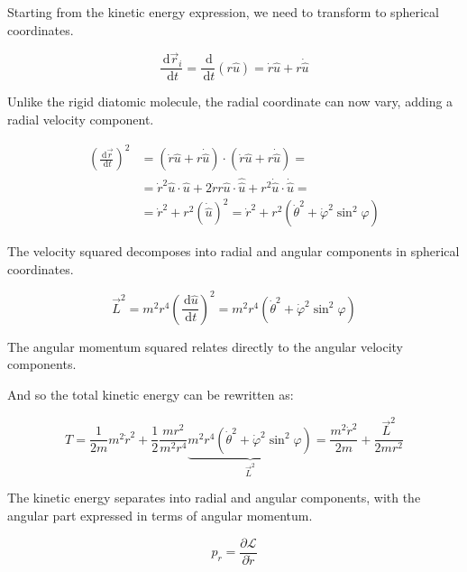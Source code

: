 \documentclass[italian]{HKNdocument}
\begin{document}
Starting from the kinetic energy expression, we need to transform to spherical coordinates.

\begin{equation}
\frac{\, \mathrm{d} \vec{r}_{i}}{\, \mathrm{d} t}=\frac{\, \mathrm{d}}{\, \mathrm{d} t}(r \hat{u})=\dot{r} \hat{u}+r \dot{\hat{u}}
\end{equation}

Unlike the rigid diatomic molecule, the radial coordinate can now vary, adding a radial velocity component.

\begin{align}
\left(\frac{\, \mathrm{d} \vec{r}}{\, \mathrm{d} t}\right)^{2} & =(\dot{r} \hat{u}+r \dot{\hat{u}}) \cdot(\dot{r} \hat{u}+r \dot{\hat{u}})= \\
& =\dot{r}^{2} \hat{u} \cdot \hat{u}+2 \dot{r} r \hat{u} \cdot \hat{\hat{u}}+r^{2} \dot{\hat{u}} \cdot \dot{\hat{u}}=  \\
& =\dot{r}^{2}+r^{2}(\dot{\hat{u}})^{2}=\dot{r}^{2}+r^{2}\left(\dot{\theta}^{2}+\dot{\varphi}^{2} \sin ^{2} \varphi\right)
\end{align}

The velocity squared decomposes into radial and angular components in spherical coordinates.

\begin{equation}
\vec{L}^{2}=m^{2} r^{4}\left(\frac{\, \mathrm{d} \hat{u}}{\, \mathrm{d} t}\right)^{2}=m^{2} r^{4}\left(\dot{\theta}^{2}+\dot{\varphi}^{2} \sin ^{2} \varphi\right)
\end{equation}

The angular momentum squared relates directly to the angular velocity components.

And so the total kinetic energy can be rewritten as:

\begin{equation}
T=\frac{1}{2 m} m^{2} \dot{r}^{2}+\frac{1}{2} \frac{m r^{2}}{m^{2} r^{4}} \underbrace{m^{2} r^{4}\left(\dot{\theta}^{2}+\dot{\varphi}^{2} \sin ^{2} \varphi\right)}_{\vec{L}^{2}}=\frac{m^{2} \dot{r}^{2}}{2 m}+\frac{\vec{L}^{2}}{2 m r^{2}}
\end{equation}

The kinetic energy separates into radial and angular components, with the angular part expressed in terms of angular momentum.

\begin{equation}
p_{r}=\frac{\partial \mathcal{L}}{\partial \dot{r}}
\end{equation}
\end{document}
